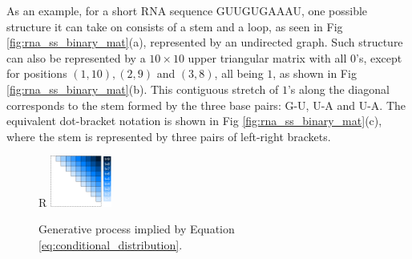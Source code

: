 \documentclass{article}
\begin{document}
%
%
%
%

As an example, for a short RNA sequence GUUGUGAAAU, one possible structure it can take on
consists of a stem and a loop, as seen in Fig \ref{fig:rna_ss_binary_mat}(a), represented by an undirected graph.
Such structure can also be represented by a $10 \times 10$ upper triangular matrix with all $0$'s,
except for positions
$(1, 10), (2, 9)$ and $(3, 8)$,
all being $1$, as shown in Fig \ref{fig:rna_ss_binary_mat}(b).
This contiguous stretch of $1$'s along the diagonal corresponds to the stem formed by the three base pairs: G-U, U-A and U-A.
The equivalent dot-bracket notation is shown in Fig \ref{fig:rna_ss_binary_mat}(c), where the stem is represented
by three pairs of left-right brackets.








\begin{figure}{R}
    \centering
    \includegraphics[width=0.18\textwidth]{plot/autoregressive_direction.pdf}
    \caption{Generative process implied by Equation \ref{eq:conditional_distribution}.}
    \label{fig:autoregressive_direction}
    \centering
\end{figure}
\end{document}
